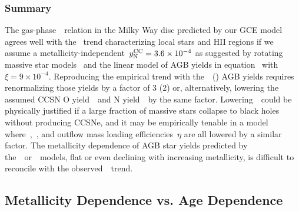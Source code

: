 \subsubsection{Summary}
\label{ohno:sec:results:yields:summary}
The gas-phase~\ohno~relation in the Milky Way disc predicted by our GCE model
agrees well with the~\citet{Dopita2016} trend characterizing local stars and
HII regions if we assume a metallicity-independent~$y_\text{N}^\text{CC} = 3.6\times10^{-4}$
as suggested by rotating massive star models~\citep{Limongi2018} and the linear
model of AGB yields in equation~
with~$\xi = 9\times10^{-4}$.
Reproducing the empirical trend with the~\cristallo~(\ventura) AGB yields
requires renormalizing those yields by a factor of 3 (2) or, alternatively,
lowering the assumed CCSN O yield~~and N yield~~by the same
factor.
Lowering~~could be physically justified if a large fraction of massive
stars collapse to black holes without producing CCSNe, and it may be
empirically tenable in a model where~,~, and outflow mass
loading efficiencies~$\eta$ are all lowered by a similar factor.
The metallicity dependence of AGB star yields predicted by
the~\karakasten~or~\karakas~models, flat or even declining with increasing
metallicity, is difficult to reconcile with the observed~\ohno~trend.

\subsection{Metallicity Dependence vs. Age Dependence}
\label{ohno:sec:results:t_z_dep_comp}


